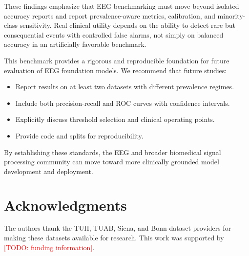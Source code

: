 \documentclass[journal]{IEEEtran}
\newcommand{\TODO}[1]{\textcolor{red}{[TODO: #1]}}
\begin{document}
These findings emphasize that EEG benchmarking must move beyond isolated accuracy reports and report prevalence-aware metrics, calibration, and minority-class sensitivity. Real clinical utility depends on the ability to detect rare but consequential events with controlled false alarms, not simply on balanced accuracy in an artificially favorable benchmark.

This benchmark provides a rigorous and reproducible foundation for future evaluation of EEG foundation models. We recommend that future studies:
\begin{itemize}
  \item Report results on at least two datasets with different prevalence regimes.
  \item Include both precision-recall and ROC curves with confidence intervals.
  \item Explicitly discuss threshold selection and clinical operating points.
  \item Provide code and splits for reproducibility.
\end{itemize}

By establishing these standards, the EEG and broader biomedical signal processing community can move toward more clinically grounded model development and deployment.

\section*{Acknowledgments}
The authors thank the TUH, TUAB, Siena, and Bonn dataset providers for making these datasets available for research. This work was supported by \TODO{funding information}.
\end{document}
